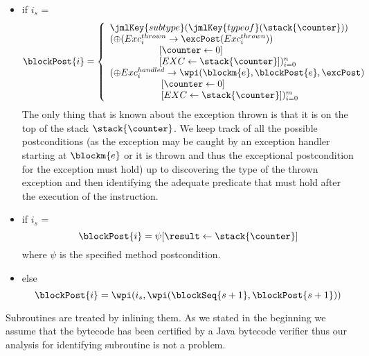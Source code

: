 \begin{defn}
\begin{itemize}
\item  if  $i_s$ =   \\ 
$$
\blockPost{i }  \\ 
 =   \left\{ \begin{array}{l} 
		\jmlKey{subtype}( \jmlKey{ typeof}(\stack{\counter} )) \\
		(\oplus (Exc_{i}^{thrown} \rightarrow \excPost(Exc_{i}^{thrown}) ) \\
		\phantom{\oplus Exc^{thrown} } [\counter \leftarrow  0] \\ 
		\phantom{ \oplus Exc^{thrown} } [EXC \leftarrow  \stack{\counter} ] )_{i=0}^{n}   \\
		(\oplus Exc_{i}^{handled} \rightarrow \wpi(\blockm{e}, \blockPost{e}, \excPost )\\
		\phantom{\oplus Exc^{handled} } [\counter \leftarrow  0] \\ 
		\phantom{ \oplus Exc^{handled}} [EXC \leftarrow  \stack{\counter} ] )_{i=0}^{m} \\
		\end{array} \right.
$$
The only thing that is known about the exception thrown is that it is 
on the top of the stack $\stack{\counter}$. We keep track of all the possible postconditions (as the exception
may be caught by an exception handler starting at $\blockm{e}$ or it is thrown and thus the exceptional postcondition for 
the exception must hold) up to
discovering the type of the thrown exception and then identifying the adequate predicate 
that must hold after the execution of the  instruction. 
\item  if  $i_s$ =  \\
$$
   \blockPost{i } = \psi[\result \leftarrow \stack{\counter} ]    
$$
where $\psi $ is the specified method postcondition.
\item  else  
 $$ \blockPost{i} =  \wpi(  i_s , \wpi( \blockSeq{s+1} ,  \blockPost{ s  +1} ) )  $$ 
 \end{itemize}
\end{defn}

Subroutines are treated by inlining them. As we stated in the beginning we assume that the bytecode has been certified by a Java
bytecode verifier thus our analysis for identifying  subroutine is not a problem.  

